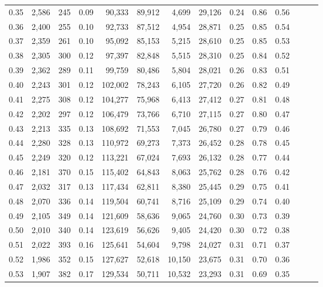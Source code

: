\begin{tabular}{rrrrrrrrrrrrrr}
0.35 &  2,586 &  245 &  0.09 &   90,333 &   89,912 &   4,699 &  29,126 &  0.24 &  0.86 &      0.56 \\
0.36 &  2,400 &  255 &  0.10 &   92,733 &   87,512 &   4,954 &  28,871 &  0.25 &  0.85 &      0.54 \\
0.37 &  2,359 &  261 &  0.10 &   95,092 &   85,153 &   5,215 &  28,610 &  0.25 &  0.85 &      0.53 \\
0.38 &  2,305 &  300 &  0.12 &   97,397 &   82,848 &   5,515 &  28,310 &  0.25 &  0.84 &      0.52 \\
0.39 &  2,362 &  289 &  0.11 &   99,759 &   80,486 &   5,804 &  28,021 &  0.26 &  0.83 &      0.51 \\
0.40 &  2,243 &  301 &  0.12 &  102,002 &   78,243 &   6,105 &  27,720 &  0.26 &  0.82 &      0.49 \\
0.41 &  2,275 &  308 &  0.12 &  104,277 &   75,968 &   6,413 &  27,412 &  0.27 &  0.81 &      0.48 \\
0.42 &  2,202 &  297 &  0.12 &  106,479 &   73,766 &   6,710 &  27,115 &  0.27 &  0.80 &      0.47 \\
0.43 &  2,213 &  335 &  0.13 &  108,692 &   71,553 &   7,045 &  26,780 &  0.27 &  0.79 &      0.46 \\
0.44 &  2,280 &  328 &  0.13 &  110,972 &   69,273 &   7,373 &  26,452 &  0.28 &  0.78 &      0.45 \\
0.45 &  2,249 &  320 &  0.12 &  113,221 &   67,024 &   7,693 &  26,132 &  0.28 &  0.77 &      0.44 \\
0.46 &  2,181 &  370 &  0.15 &  115,402 &   64,843 &   8,063 &  25,762 &  0.28 &  0.76 &      0.42 \\
0.47 &  2,032 &  317 &  0.13 &  117,434 &   62,811 &   8,380 &  25,445 &  0.29 &  0.75 &      0.41 \\
0.48 &  2,070 &  336 &  0.14 &  119,504 &   60,741 &   8,716 &  25,109 &  0.29 &  0.74 &      0.40 \\
0.49 &  2,105 &  349 &  0.14 &  121,609 &   58,636 &   9,065 &  24,760 &  0.30 &  0.73 &      0.39 \\
0.50 &  2,010 &  340 &  0.14 &  123,619 &   56,626 &   9,405 &  24,420 &  0.30 &  0.72 &      0.38 \\
0.51 &  2,022 &  393 &  0.16 &  125,641 &   54,604 &   9,798 &  24,027 &  0.31 &  0.71 &      0.37 \\
0.52 &  1,986 &  352 &  0.15 &  127,627 &   52,618 &  10,150 &  23,675 &  0.31 &  0.70 &      0.36 \\
0.53 &  1,907 &  382 &  0.17 &  129,534 &   50,711 &  10,532 &  23,293 &  0.31 &  0.69 &      0.35 \\

\end{tabular}
